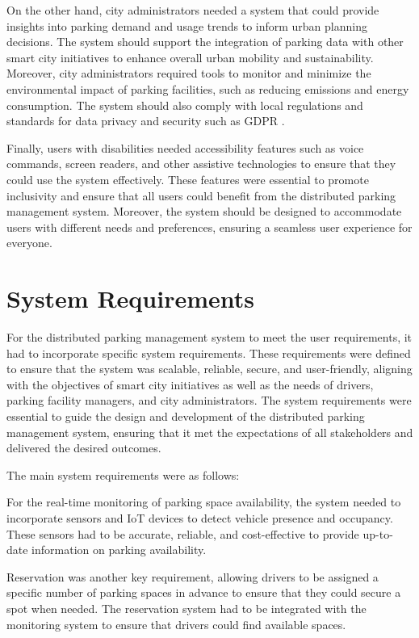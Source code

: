 On the other hand, city administrators needed a system that could provide insights into parking demand and usage trends to inform urban planning decisions.
The system should support the integration of parking data with other smart city initiatives to enhance overall urban mobility and sustainability.
Moreover, city administrators required tools to monitor and minimize the environmental impact of parking facilities, such as reducing emissions and energy consumption.
The system should also comply with local regulations and standards for data privacy and security such as GDPR \autocite{gdpr}.

Finally, users with disabilities needed accessibility features such as voice commands, screen readers, and other assistive technologies to ensure that they could use the system effectively.
These features were essential to promote inclusivity and ensure that all users could benefit from the distributed parking management system.
Moreover, the system should be designed to accommodate users with different needs and preferences, ensuring a seamless user experience for everyone.

\section{System Requirements}\label{sec:system_requirements}

For the distributed parking management system to meet the user requirements, it had to incorporate specific system requirements.
These requirements were defined to ensure that the system was scalable, reliable, secure, and user-friendly, aligning with the objectives of smart city initiatives as well as the needs of drivers, parking facility managers, and city administrators.
The system requirements were essential to guide the design and development of the distributed parking management system, ensuring that it met the expectations of all stakeholders and delivered the desired outcomes.

The main system requirements were as follows:

For the real-time monitoring of parking space availability, the system needed to incorporate sensors and IoT devices to detect vehicle presence and occupancy.
These sensors had to be accurate, reliable, and cost-effective to provide up-to-date information on parking availability.

Reservation was another key requirement, allowing drivers to be assigned a specific number of parking spaces in advance to ensure that they could secure a spot when needed.
The reservation system had to be integrated with the monitoring system to ensure that drivers could find available spaces.

